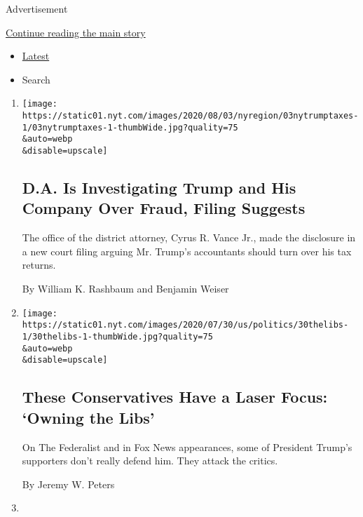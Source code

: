 Advertisement

\protect\hyperlink{after-mid1}{Continue reading the main story}

\begin{itemize}
\tightlist
\item
  \protect\hyperlink{stream-panel}{Latest}
\item
  Search
\end{itemize}

\begin{enumerate}
\def\labelenumi{\arabic{enumi}.}
\item
  \href{/2020/08/03/nyregion/donald-trump-taxes-cyrus-vance.html}{}

  \texttt{[image: https://static01.nyt.com/images/2020/08/03/nyregion/03nytrumptaxes-1/03nytrumptaxes-1-thumbWide.jpg?quality=75\\\&auto=webp\\\&disable=upscale]}

  \hypertarget{da-is-investigating-trump-and-his-company-over-fraud-filing-suggests}{%
  \subsection{D.A. Is Investigating Trump and His Company Over Fraud,
  Filing
  Suggests}\label{da-is-investigating-trump-and-his-company-over-fraud-filing-suggests}}

  The office of the district attorney, Cyrus R. Vance Jr., made the
  disclosure in a new court filing arguing Mr. Trump's accountants
  should turn over his tax returns.

  By William K. Rashbaum and Benjamin Weiser
\item
  \href{/2020/08/03/us/politics/the-federalist-trump-liberals.html}{}

  \texttt{[image: https://static01.nyt.com/images/2020/07/30/us/politics/30thelibs-1/30thelibs-1-thumbWide.jpg?quality=75\\\&auto=webp\\\&disable=upscale]}

  \hypertarget{these-conservatives-have-a-laser-focus-owning-the-libs}{%
  \subsection{These Conservatives Have a Laser Focus: `Owning the
  Libs'}\label{these-conservatives-have-a-laser-focus-owning-the-libs}}

  On The Federalist and in Fox News appearances, some of President
  Trump's supporters don't really defend him. They attack the critics.

  By Jeremy W. Peters
\item
  \href{/2020/08/03/nyregion/nyc-mail-ballots-voting.html}{}


\end{enumerate}
